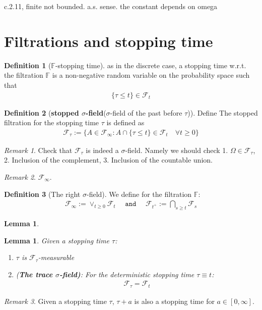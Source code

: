 \documentclass[a4paper,11pt]{book}
\newtheorem{lemma}[theorem]{Lemma}
\theoremstyle{definition}
\newtheorem{definition}{Definition}[section]
\theoremstyle{remark}
\newtheorem*{remark}{Remark}
\begin{document}
c.2.11, finite not bounded. a.s. sense. the constant depends on omega



\section{Filtrations and stopping time}
\begin{definition}[$\mathbb{F}$-stopping time]
	as in the discrete case, a stopping time w.r.t. the filtration $\mathbb{F}$ is a non-negative random variable on the probability space such that 
	\begin{align*}
		\{ \tau \le t \} \in \mathcal{F}_t
	\end{align*}
\end{definition}

\begin{definition}[\textbf{stopped $\sigma$-field}($\sigma$-field of the past before $\tau$)]
Define
The stopped filtration for the stopping time $\tau$ is defined as 
\begin{align*}
	\mathcal{F}_\tau:= \{ A \in \mathcal{F}_\infty: A \cap \{ \tau \le t \} \in \mathcal{F}_t \quad \forall t \ge 0\}
\end{align*}
\end{definition}
\begin{remark}
Check that $\mathcal{F}_\tau$ is indeed a $\sigma$-field. Namely we should check 1. $\Omega \in \mathcal{F}_\tau$, 2. Inclusion of the complement, 3. Inclusion of the countable union. 	
\end{remark}
\begin{remark}
$\mathcal{F}_\infty$. 	
\end{remark}


\begin{definition}[The right $\sigma$-field]
	We define for the filtration $\mathbb{F}$: 
	\begin{align*}
	\mathcal{F}_\infty := \vee_{t \ge 0} \mathcal{F}_t
	\quad \texttt{ and } \quad \mathcal{F}_{t^+}:= \bigcap_{s \ge t} \mathcal{F}_s
\end{align*}

\end{definition}

\begin{lemma}
	
\end{lemma}

\begin{lemma}
	Given a stopping time $\tau$:
	\begin{enumerate}
		\item $\tau$ is $\mathcal{F}_\tau$-measurable
		\item (\textbf{The trace $\sigma$-field)}: For the deterministic stopping time $\tau \equiv t$: 
		\begin{align*}
			\mathcal{F}_\tau = \mathcal{F}_t
		\end{align*}
	\end{enumerate}
\end{lemma}
\begin{remark}
Given a stopping time $\tau$, $\tau + a$ is also a stopping time for $a \in [0, \infty]$. 	
\end{remark}
\end{document}
